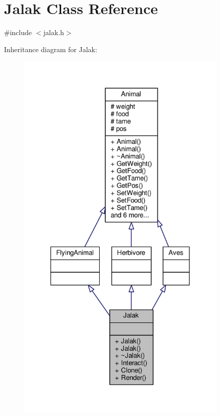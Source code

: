 \hypertarget{classJalak}{}\section{Jalak Class Reference}
\label{classJalak}


{\ttfamily \#include $<$jalak.\+h$>$}



Inheritance diagram for Jalak\+:
\nopagebreak
\begin{figure}[H]
\begin{center}
\leavevmode
\includegraphics[width=287pt]{classJalak__inherit__graph}
\end{center}
\end{figure}


